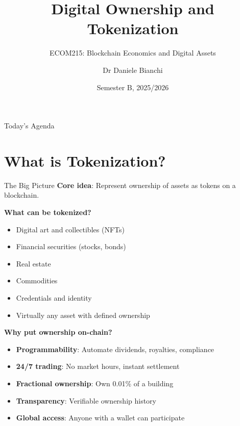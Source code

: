 \documentclass[10pt]{beamer}
\title{Digital Ownership and Tokenization}
\subtitle{ECOM215: Blockchain Economics and Digital Assets}
\author{Dr Daniele Bianchi}
\institute{Queen Mary, University of London}
\date{Semester B, 2025/2026}
\begin{document}
\AtBeginSection[]{
  \begin{frame}[plain]
    \vfill
    \begin{center}
      {\Large\color{ImperialBlue}\insertsection}
    \end{center}
    \vfill
  \end{frame}
}

\begin{frame}[plain]
  \titlepage
\end{frame}

\begin{frame}{Today's Agenda}
  \tableofcontents
\end{frame}

\section{What is Tokenization?}

\begin{frame}{The Big Picture}
  \textbf{Core idea}: Represent ownership of assets as tokens on a blockchain.
  
  \vspace{1em}
  \textbf{What can be tokenized?}
  \begin{itemize}
    \item Digital art and collectibles (NFTs)
    \item Financial securities (stocks, bonds)
    \item Real estate
    \item Commodities
    \item Credentials and identity
    \item Virtually any asset with defined ownership
  \end{itemize}
  
  \vspace{1em}
  \textbf{Why put ownership on-chain?}
  \begin{itemize}
    \item \textbf{Programmability}: Automate dividends, royalties, compliance
    \item \textbf{24/7 trading}: No market hours, instant settlement
    \item \textbf{Fractional ownership}: Own 0.01\% of a building
    \item \textbf{Transparency}: Verifiable ownership history
    \item \textbf{Global access}: Anyone with a wallet can participate
  \end{itemize}
\end{frame}
\end{document}
